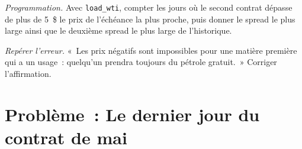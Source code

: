 \begin{exercise}[$\star\star\star$]\label{exo:m3:crude-oil:7}
\emph{Programmation.} Avec \texttt{load\_wti}, compter les jours où le second contrat
dépasse de plus de 5~\$ le prix de l'échéance la plus proche, puis donner le spread le plus large
ainsi que le deuxième spread le plus large de l'historique.
\end{exercise}

\begin{exercise}[$\star\star\star$]\label{exo:m3:crude-oil:8}
\emph{Repérer l'erreur.} «~Les prix négatifs sont impossibles pour une matière première qui a un usage~:
quelqu'un prendra toujours du pétrole gratuit.~» Corriger l'affirmation.
\end{exercise}

\section{Problème~: Le dernier jour du contrat de mai}


